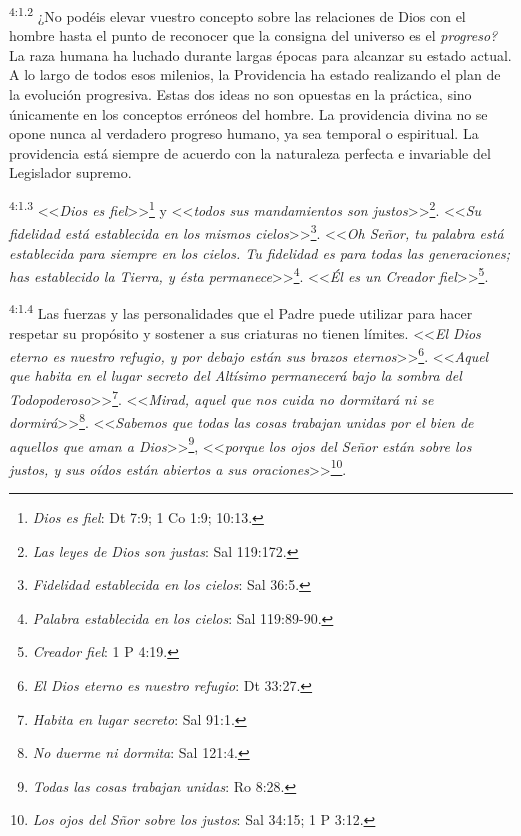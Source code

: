 \par
\textsuperscript{4:1.2} ¿No podéis elevar vuestro concepto sobre las relaciones de Dios con el hombre hasta el punto de reconocer que la consigna del universo es el \textit{progreso?} La raza humana ha luchado durante largas épocas para alcanzar su estado actual. A lo largo de todos esos milenios, la Providencia ha estado realizando el plan de la evolución progresiva. Estas dos ideas no son opuestas en la práctica, sino únicamente en los conceptos erróneos del hombre. La providencia divina no se opone nunca al verdadero progreso humano, ya sea temporal o espiritual. La providencia está siempre de acuerdo con la naturaleza perfecta e invariable del Legislador supremo.

\par
\textsuperscript{4:1.3} <<\textit{Dios es fiel}>>\footnote{\textit{Dios es fiel}: Dt 7:9; 1 Co 1:9; 10:13.} y <<\textit{todos sus mandamientos son justos}>>\footnote{\textit{Las leyes de Dios son justas}: Sal 119:172.}. <<\textit{Su fidelidad está establecida en los mismos cielos}>>\footnote{\textit{Fidelidad establecida en los cielos}: Sal 36:5.}. <<\textit{Oh Señor, tu palabra está establecida para siempre en los cielos. Tu fidelidad es para todas las generaciones; has establecido la Tierra, y ésta permanece}>>\footnote{\textit{Palabra establecida en los cielos}: Sal 119:89-90.}. <<\textit{Él es un Creador fiel}>>\footnote{\textit{Creador fiel}: 1 P 4:19.}.

\par
\textsuperscript{4:1.4} Las fuerzas y las personalidades que el Padre puede utilizar para hacer respetar su propósito y sostener a sus criaturas no tienen límites. <<\textit{El Dios eterno es nuestro refugio, y por debajo están sus brazos eternos}>>\footnote{\textit{El Dios eterno es nuestro refugio}: Dt 33:27.}. <<\textit{Aquel que habita en el lugar secreto del Altísimo permanecerá bajo la sombra del Todopoderoso}>>\footnote{\textit{Habita en lugar secreto}: Sal 91:1.}. <<\textit{Mirad, aquel que nos cuida no dormitará ni se dormirá}>>\footnote{\textit{No duerme ni dormita}: Sal 121:4.}. <<\textit{Sabemos que todas las cosas trabajan unidas por el bien de aquellos que aman a Dios}>>\footnote{\textit{Todas las cosas trabajan unidas}: Ro 8:28.}, <<\textit{porque los ojos del Señor están sobre los justos, y sus oídos están abiertos a sus oraciones}>>\footnote{\textit{Los ojos del Sñor sobre los justos}: Sal 34:15; 1 P 3:12.}.

